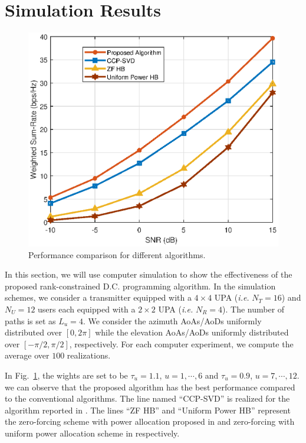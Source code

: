\documentclass[10pt,journal,twocolumn,twoside]{IEEEtran}
\begin{document}
\section{Simulation Results}
\begin{figure}[ht]
	\begin{center}
		\includegraphics[scale=0.65]{Figure/comparison.eps}
		\caption{Performance comparison for different algorithms.}\label{fig:comparison}
	\end{center}
\end{figure}
In this section, we will use computer simulation to show the effectiveness of the proposed rank-constrained D.C. programming algorithm. In the simulation schemes, we consider a transmitter equipped with a $4\times 4$ UPA ({\em i.e.} $N_T=16$) and $N_U=12$ users each equipped with a $2\times 2$ UPA ({\em i.e.} $N_R=4$). The number of paths is set as $L_{u} = 4$. We consider the azimuth AoAs/AoDs uniformly distributed over $[0, 2\pi]$ while the elevation AoAs/AoDs uniformly distributed over $[-\pi/2, \pi/2]$, respectively. For each computer experiment, we compute the average over $100$ realizations.

In Fig.~\ref{fig:comparison}, the wights are set to be $\tau_u = 1.1$, $u = 1,\cdots, 6$ and $\tau_u = 0.9$, $u = 7,\cdots, 12$.  we can observe that the proposed algorithm has the best performance compared to the conventional algorithms. The line named ``CCP-SVD'' is realized for the algorithm reported in \cite{hu2018joint}. The lines ``ZF HB'' and ``Uniform Power HB'' represent the zero-forcing scheme with power allocation proposed in \cite{kha2012fast} and zero-forcing with uniform power allocation scheme in \cite{alkhateeb2014channel} respectively.
\end{document}
